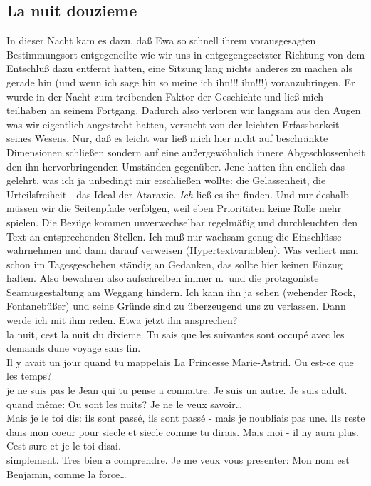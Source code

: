 \documentclass[
]{article}
\author{}
\date{\vspace{-2.5em}}
\begin{document}
\subsection{La nuit douzieme}\label{la-nuit-douzieme}

In dieser Nacht kam es dazu, daß Ewa so schnell ihrem vorausgesagten
Bestimmungsort entgegeneilte wie wir uns in entgegengesetzter Richtung
von dem Entschluß dazu entfernt hatten, eine Sitzung lang nichts anderes
zu machen als gerade hin (und wenn ich sage hin so meine ich ihn!!!
ihn!!!) voranzubringen. Er wurde in der Nacht zum treibenden Faktor der
Geschichte und ließ mich teilhaben an seinem Fortgang. Dadurch also
verloren wir langsam aus den Augen was wir eigentlich angestrebt hatten,
versucht von der leichten Erfassbarkeit seines Wesens. Nur, daß es
leicht war ließ mich hier nicht auf beschränkte Dimensionen schließen
sondern auf eine außergewöhnlich innere Abgeschlossenheit den ihn
hervorbringenden Umständen gegenüber. Jene hatten ihn endlich das
gelehrt, was ich ja unbedingt mir erschließen wollte: die Gelassenheit,
die Urteilsfreiheit - das Ideal der Ataraxie. \emph{Ich} ließ es ihn
finden. Und nur deshalb müssen wir die Seitenpfade verfolgen, weil eben
Prioritäten keine Rolle mehr spielen. Die Bezüge kommen unverwechselbar
regelmäßig und durchleuchten den Text an entsprechenden Stellen. Ich muß
nur wachsam genug die Einschlüsse wahrnehmen und dann darauf verweisen
(Hypertextvariablen). Was verliert man schon im Tagesgeschehen ständig
an Gedanken, das sollte hier keinen Einzug halten. Also bewahren also
aufschreiben immer n.~und die protagoniste Seamusgestaltung am Weggang
hindern. Ich kann ihn ja sehen (wehender Rock, Fontanebüßer) und seine
Gründe sind zu überzeugend uns zu verlassen. Dann werde ich mit ihm
reden. Etwa jetzt ihn ansprechen?\\
la nuit, c\textquotesingle est la nuit du dixieme. Tu sais que les
suivantes sont occupé avec les demands d\textquotesingle une voyage sans
fin.\\
Il y avait un jour quand tu m\textquotesingle appelais La Princesse
Marie-Astrid. Ou est-ce que les temps?\\
je ne suis pas le Jean qui tu pense a connaitre. Je suis un autre. Je
suis adult.\\
quand même: Ou sont les nuits? Je ne le veux savoir\ldots{}\\
Mais je le toi dis: ils sont passé, ils sont passé - mais je
n\textquotesingle oubliais pas une. Ils reste dans mon coeur pour siecle
et siecle comme tu dirais. Mais moi - il n\textquotesingle y aura plus.
C\textquotesingle est sure et je le toi disai.\\
simplement. Tres bien a comprendre. Je me veux vous presenter: Mon nom
est Benjamin, comme la force\ldots{}
\end{document}

